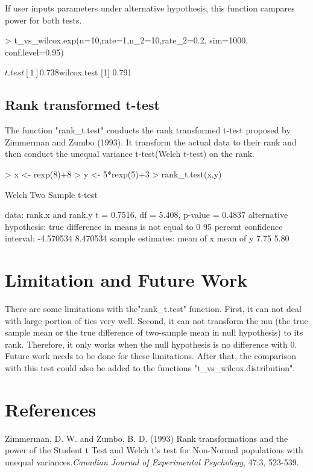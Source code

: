\documentclass[11pt]{article}
\begin{document}
If user inputs parameters under alternative hypothesis, this function campares power for both tests.
\begin{Schunk}
\begin{Sinput}
> t_vs_wilcox.exp(n=10,rate=1,n_2=10,rate_2=0.2, sim=1000, conf.level=0.95)
\end{Sinput}
\begin{Soutput}
$t.test
[1] 0.738

$wilcox.test
[1] 0.791
\end{Soutput}
\end{Schunk}

\subsection{Rank transformed t-test}
The function "rank\_t.test" conducts the rank transformed t-test proposed by Zimmerman and Zumbo (1993). It transform the actual data to their rank and then conduct the unequal variance t-test(Welch t-test) on the rank.

\begin{Schunk}
\begin{Sinput}
> x <- rexp(8)+8
> y <- 5*rexp(5)+3
> rank_t.test(x,y)
\end{Sinput}
\begin{Soutput}
	Welch Two Sample t-test

data:  rank.x and rank.y 
t = 0.7516, df = 5.408, p-value = 0.4837
alternative hypothesis: true difference in means is not equal to 0 
95 percent confidence interval:
 -4.570534  8.470534 
sample estimates:
mean of x mean of y 
     7.75      5.80 
\end{Soutput}
\end{Schunk}

\section{Limitation and Future Work}
There are some limitations with the"rank\_t.test" function. First, it can not deal with large portion of ties very well. Second, it can not transform the mu (the true sample mean or the true difference of two-sample mean in null hypothesis) to its rank. Therefore, it only works when the null hypothesis is no difference with 0. Future work needs to be done for these limitations. After that, the comparison with this test could also be added to the functions "t\_vs\_wilcox.distribution". 
\section{References}
Zimmerman, D. W. and Zumbo, B. D. (1993) Rank transformations and the power of the Student t Test and Welch t's test for Non-Normal populations with unequal variances.\emph {Canadian Journal of Experimental Psychology}, 47:3, 523-539.
\end{document}
